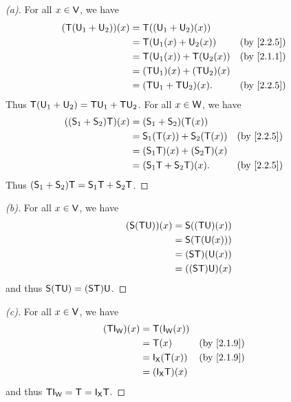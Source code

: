 \begin{proof}[(a)]
	For all \(x \in \mathsf{V}\), we have
	\begin{align*}
		(\T(\U_1 + \U_2))(x) & = \T((\U_1 + \U_2)(x))                        \\
		                     & = \T(\U_1(x) + \U_2(x))       &  & \by{2.2.5} \\
		                     & = \T(\U_1(x)) + \T(\U_2(x))   &  & \by{2.1.1} \\
		                     & = (\T \U_1)(x) + (\T \U_2)(x)                 \\
		                     & = (\T \U_1 + \T \U_2)(x).     &  & \by{2.2.5}
	\end{align*}
	Thus \(\mathsf{T}(\mathsf{U}_1 + \mathsf{U}_2) = \mathsf{T} \mathsf{U}_1 + \mathsf{T} \mathsf{U}_2\).
	For all \(x \in \mathsf{W}\), we have
	\begin{align*}
		((\vs{S}_1 + \vs{S}_2) \T)(x) & = (\vs{S}_1 + \vs{S}_2)(\T(x))                        \\
		                              & = \vs{S}_1(\T(x)) + \vs{S}_2(\T(x))   &  & \by{2.2.5} \\
		                              & = (\vs{S}_1 \T)(x) + (\vs{S}_2 \T)(x)                 \\
		                              & = (\vs{S}_1 \T + \vs{S}_2 \T)(x).     &  & \by{2.2.5}
	\end{align*}
	Thus \((\mathsf{S}_1 + \mathsf{S}_2) \mathsf{T} = \mathsf{S}_1 \mathsf{T} + \mathsf{S}_2 \mathsf{T}\).
\end{proof}

\begin{proof}[(b)]
	For all \(x \in \mathsf{V}\), we have
	\begin{align*}
		(\mathsf{S} (\mathsf{T} \mathsf{U}))(x) & = \mathsf{S}((\mathsf{T} \mathsf{U})(x))  \\
		                    & = \mathsf{S}(\mathsf{T}(\mathsf{U}(x)))   \\
		                    & = (\mathsf{S} \mathsf{T})(\mathsf{U}(x))  \\
		                    & = ((\mathsf{S} \mathsf{T}) \mathsf{U})(x)
	\end{align*}
	and thus \(\mathsf{S} (\mathsf{T} \mathsf{U}) = (\mathsf{S} \mathsf{T}) \mathsf{U}\).
\end{proof}

\begin{proof}[(c)]
	For all \(x \in \mathsf{V}\), we have
	\begin{align*}
		(\T \IT[\W])(x) & = \T(\IT[\W](x))                      \\
		                & = \T(x)               &  & \by{2.1.9} \\
		                & = \IT[\vs{X}](\T(x))  &  & \by{2.1.9} \\
		                & = (\IT[\vs{X}] \T)(x)
	\end{align*}
	and thus \(\T \IT[\W] = \T = \IT[\vs{X}] \T\).
\end{proof}

